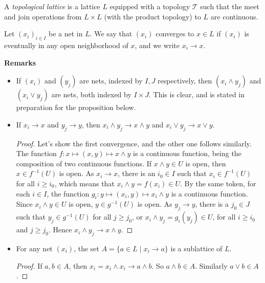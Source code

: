 \documentclass[12pt]{article}
\begin{document}
A \emph{topological lattice} is a lattice $L$ equipped with a topology $\mathcal{T}$ such that the meet and join operations from $L\times L$ (with the product topology) to $L$ are continuous.

Let $(x_i)_{i\in I}$ be a net in $L$.  We say that $(x_i)$ converges to $x\in L$ if $(x_i)$ is eventually in any open neighborhood of $x$, and we write $x_i\to x$.  

\textbf{Remarks}
\begin{itemize}
\item If $(x_i)$ and $(y_j)$ are nets, indexed by $I,J$ respectively, then $(x_i\wedge y_j)$ and $(x_i\vee y_j)$ are nets, both indexed by $I\times J$.  This is clear, and is stated in preparation for the proposition below.
\item If $x_i\to x$ and $y_j\to y$, then $x_i\wedge y_j\to x\wedge y$ and $x_i \vee y_j\to x\vee y$.
\begin{proof}  Let's show the first convergence, and the other one follows similarly.  The function $f:x\mapsto (x,y) \mapsto x\wedge y$ is a continuous function, being the composition of two continuous functions.  If $x\wedge y\in U$ is open, then $x\in f^{-1}(U)$ is open.  As $x_i\to x$, there is an $i_0 \in I$ such that $x_i\in f^{-1}(U)$ for all $i\ge i_0$, which means that $x_i\wedge y=f(x_i)\in U$.  By the same token, for each $i\in I$, the function $g_i: y\mapsto (x_i,y)\mapsto x_i\wedge y$ is a continuous function.  Since $x_i\wedge y\in U$ is open, $y\in g^{-1}(U)$ is open.  As $y_j\to y$, there is a $j_0\in J$ such that $y_j\in g^{-1}(U)$ for all $j\ge j_0$, or $x_i\wedge y_j=g_i(y_j) \in U$, for all $i\ge i_0$ and $j\ge j_0$.  Hence $x_i\wedge y_j\to x\wedge y$.
\end{proof}
\item For any net $(x_i)$, the set $A=\lbrace a\in L \mid x_i\to a\rbrace$ is a sublattice of $L$.
\begin{proof}
If $a,b\in A$, then $x_i=x_i\wedge x_i\to a\wedge b$.  So $a\wedge b\in A$.  Similarly $a\vee b\in A$.
\end{proof}

\end{itemize}
\end{document}
